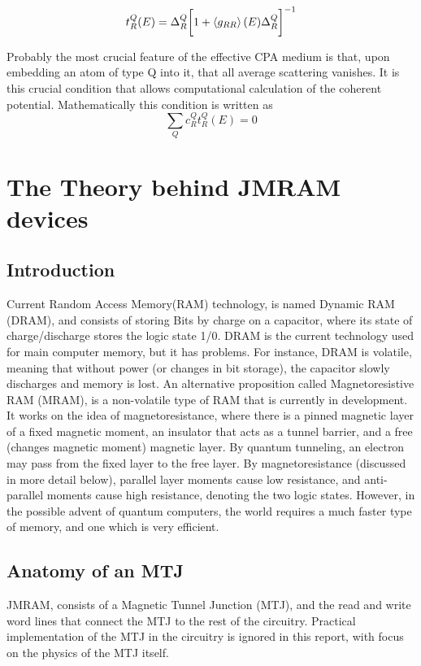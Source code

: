 \documentclass[12pt]{article}
\begin{document}
$$t_R^Q(E)=\Delta^Q_R\bigg[1+\expval{g_{RR}}(E)\Delta^Q_R\bigg]^{-1}$$

Probably the most crucial feature of the effective CPA medium is that, upon embedding an atom of type Q into it, that all average scattering vanishes. It is this crucial condition that allows computational calculation of the coherent potential. Mathematically this condition is written as \cite{turek}
$$\sum_Qc_R^Qt_R^Q(E)=0$$

\section{The Theory behind JMRAM devices}
\subsection{Introduction}

Current Random Access Memory(RAM) technology, is named Dynamic RAM (DRAM), and consists of storing Bits by charge on a capacitor, where its state of charge/discharge stores the logic state 1/0. DRAM is the current technology used for main computer memory, but it has problems. For instance, DRAM is volatile, meaning that without power (or changes in bit storage), the capacitor slowly discharges and memory is lost. An alternative proposition called Magnetoresistive RAM (MRAM), is a non-volatile type of RAM that is currently in development. It works on the idea of magnetoresistance, where there is a pinned magnetic layer of a fixed magnetic moment, an insulator that acts as a tunnel barrier, and a free (changes magnetic moment) magnetic layer. By quantum tunneling, an electron may pass from the fixed layer to the free layer. By magnetoresistance (discussed in more detail below), parallel layer moments cause low resistance, and anti-parallel moments cause high resistance, denoting the two logic states. However, in the possible advent of quantum computers, the world requires a much faster type of memory, and one which is very efficient.

\subsection{Anatomy of an MTJ}

JMRAM, consists of a Magnetic Tunnel Junction (MTJ), and the read and write word lines that connect the MTJ to the rest of the circuitry. Practical implementation of the MTJ in the circuitry is ignored in this report, with focus on the physics of the MTJ itself.
 
\end{document}
